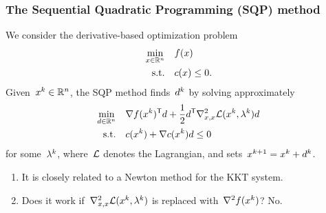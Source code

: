\documentclass{polyu-presentation}
\newcommand{\con}[1][]{c\ifthenelse{\equal{#1}{}}{}{_{#1}}}
\newcommand{\iter}[1][]{x\ifthenelse{\equal{#1}{}}{}{^{#1}}}
\newcommand{\lag}[1][]{\mathcal{L}\ifthenelse{\equal{#1}{}}{}{^{#1}}}
\newcommand{\lm}[1][]{\lambda\ifthenelse{\equal{#1}{}}{}{^{#1}}}
\newcommand{\obj}{f}
\newcommand{\step}[1][]{d\ifthenelse{\equal{#1}{}}{}{^{#1}}}
\begin{document}
\begin{frame}
    \frametitle{The Sequential Quadratic Programming (SQP) method}

    We consider the \alert{derivative-based}     optimization problem
    \begin{align*}
        \min_{\iter \in \R^n}   & \quad \obj(\iter)\\
        \text{s.t.}             & \quad \con(\iter) \le 0.
    \end{align*}
	Given~$\iter[k] \in \R^n$, the \alert{SQP method} finds~$\step[k]$ by solving approximately
    \begin{align*}
        \min_{\step \in \R^n}   & \quad \nabla \obj(\iter[k])^{\T} \step + \frac{1}{2} \step^{\T} \nabla_{x, x}^2 \lag(\iter[k], \lm[k]) \step\\
        \text{s.t.}             & \quad \con(\iter[k]) + \nabla \con(\iter[k]) \step \le 0
    \end{align*}
    for some~$\lm[k]$, where~$\lag$ denotes the \alert{Lagrangian}, and sets~$\iter[k + 1] = \iter[k] + \step[k]$.
    
    \medskip

    \begin{block}{}
        \begin{enumerate}
            \item It is closely related to a \alert{Newton} method for the KKT system.
            \item Does it work if~$\nabla_{x, x}^2 \lag(\iter[k], \lm[k])$ is replaced with~$\nabla^2 \obj(\iter[k])$?
            \pause
            \alert{No}.
        \end{enumerate}
    \end{block}
\end{frame}
\end{document}
